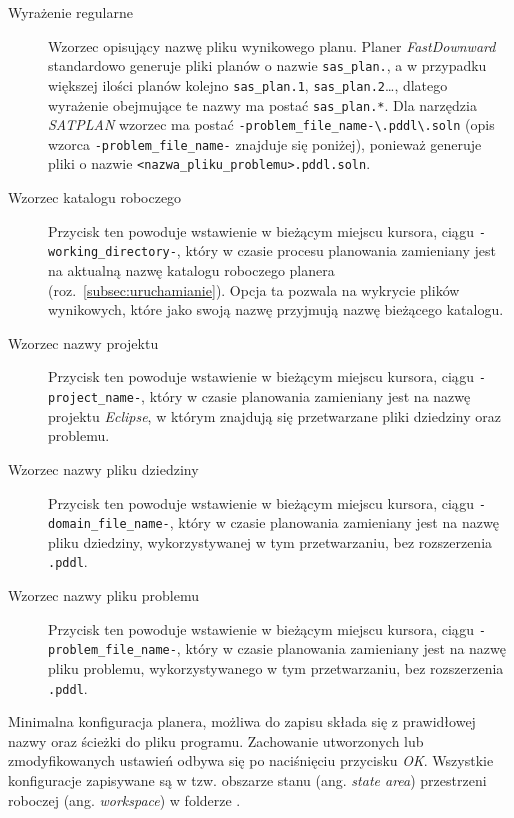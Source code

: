 {
\setcounter{alphcount}{1}
\renewcommand{\descriptionlabel}[1]%
{\hspace\labelsep\normalfont\bfseries\alph{alphcount}) #1\stepcounter{alphcount}}
\begin{description}
\item [Wyrażenie regularne] Wzorzec opisujący nazwę pliku wynikowego planu. Planer \emph{FastDownward} standardowo generuje pliki planów o nazwie \texttt{sas\_plan.}, a w przypadku większej ilości planów kolejno \texttt{sas\_plan.1}, \texttt{sas\_plan.2}\ldots, dlatego wyrażenie obejmujące te nazwy ma postać \texttt{sas\_plan.*}. Dla narzędzia \emph{SATPLAN} wzorzec ma postać \texttt{-problem\_file\_name-\textbackslash.pddl\textbackslash.soln} (opis wzorca \texttt{-problem\_file\_name-} znajduje się poniżej), ponieważ generuje pliki o nazwie \texttt{<nazwa\_pliku\_problemu>.pddl.soln}.
\item [Wzorzec katalogu roboczego] Przycisk ten powoduje wstawienie w bieżącym miejscu kursora, ciągu \texttt{-working\_directory-}, który w czasie procesu planowania zamieniany jest na aktualną nazwę katalogu roboczego planera (roz.~\ref{subsec:uruchamianie}). Opcja ta pozwala na wykrycie plików wynikowych, które jako swoją nazwę przyjmują nazwę bieżącego katalogu.
\item [Wzorzec nazwy projektu] Przycisk ten powoduje wstawienie w bieżącym miejscu kursora, ciągu \texttt{-project\_name-}, który w czasie planowania zamieniany jest na nazwę projektu \emph{Eclipse}, w którym znajdują się przetwarzane pliki dziedziny oraz problemu.
\item [Wzorzec nazwy pliku dziedziny] Przycisk ten powoduje wstawienie w bieżącym miejscu kursora, ciągu \texttt{-domain\_file\_name-}, który w czasie planowania zamieniany jest na nazwę pliku dziedziny, wykorzystywanej w tym przetwarzaniu, bez rozszerzenia \texttt{.pddl}.
\item [Wzorzec nazwy pliku problemu] Przycisk ten powoduje wstawienie w bieżącym miejscu kursora, ciągu \texttt{-problem\_file\_name-}, który w czasie planowania zamieniany jest na nazwę pliku problemu, wykorzystywanego w tym przetwarzaniu, bez rozszerzenia \texttt{.pddl}.
\end{description}
}


Minimalna konfiguracja planera, możliwa do zapisu składa się z prawidłowej nazwy oraz ścieżki do pliku programu. Zachowanie utworzonych lub zmodyfikowanych ustawień odbywa się po naciśnięciu przycisku \emph{OK}.
Wszystkie konfiguracje zapisywane są w tzw. obszarze stanu (ang. \textit{state area}) przestrzeni roboczej (ang. \textit{workspace}) w folderze . 

